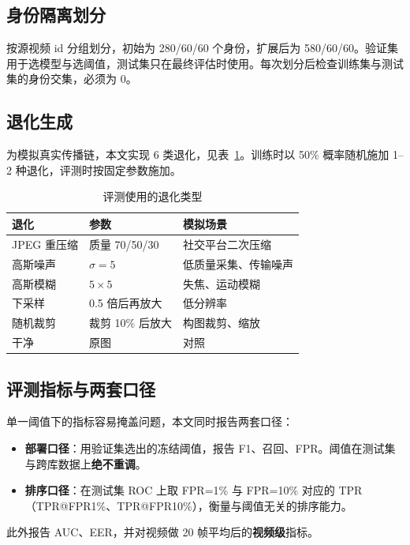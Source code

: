 \subsection{身份隔离划分}

按源视频 id 分组划分，初始为 280/60/60 个身份，扩展后为 580/60/60。验证集用于选模型与选阈值，测试集只在最终评估时使用。每次划分后检查训练集与测试集的身份交集，必须为 0。

\subsection{退化生成}

为模拟真实传播链，本文实现 6 类退化，见表~\ref{tab:degrade}。训练时以 50\% 概率随机施加 1--2 种退化，评测时按固定参数施加。

\begin{table}[H]
\centering
\caption{评测使用的退化类型}
\label{tab:degrade}
\small
\begin{tabular}{lll}
\toprule
退化 & 参数 & 模拟场景 \\
\midrule
JPEG 重压缩 & 质量 70/50/30 & 社交平台二次压缩 \\
高斯噪声 & $\sigma=5$ & 低质量采集、传输噪声 \\
高斯模糊 & $5\times5$ & 失焦、运动模糊 \\
下采样 & 0.5 倍后再放大 & 低分辨率 \\
随机裁剪 & 裁剪 10\% 后放大 & 构图裁剪、缩放 \\
干净 & 原图 & 对照 \\
\bottomrule
\end{tabular}
\end{table}

\subsection{评测指标与两套口径}

单一阈值下的指标容易掩盖问题，本文同时报告两套口径：

\begin{itemize}
  \item \textbf{部署口径}：用验证集选出的冻结阈值，报告 F1、召回、FPR。阈值在测试集与跨库数据上\textbf{绝不重调}。
  \item \textbf{排序口径}：在测试集 ROC 上取 FPR=1\% 与 FPR=10\% 对应的 TPR（TPR@FPR1\%、TPR@FPR10\%），衡量与阈值无关的排序能力。
\end{itemize}

此外报告 AUC、EER，并对视频做 20 帧平均后的\textbf{视频级}指标。

